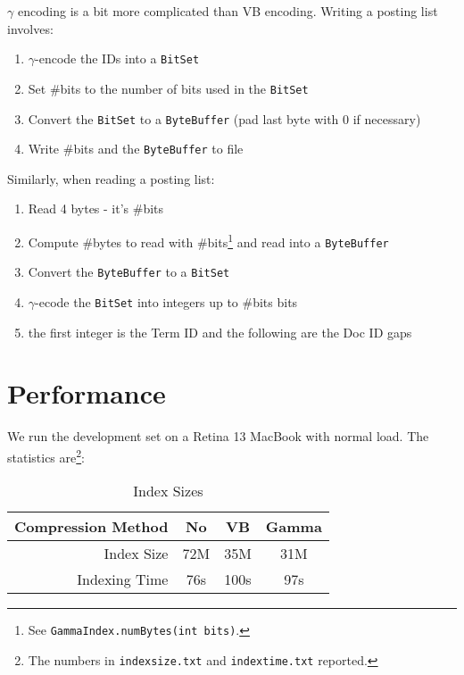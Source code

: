 \documentclass{article}
\begin{document}
$\gamma$ encoding is a bit more complicated than VB encoding. Writing a
posting list involves:
\begin{enumerate}
  \item $\gamma$-encode the IDs into a {\texttt{BitSet}}
  
  \item Set \#bits to the number of bits used in the {\texttt{BitSet}}
  
  \item Convert the {\texttt{BitSet}} to a {\texttt{ByteBuffer}} (pad last byte
  with 0 if necessary)
  
  \item Write \#bits and the {\texttt{ByteBuffer}} to file
\end{enumerate}
Similarly, when reading a posting list:
\begin{enumerate}
  \item Read 4 bytes - it's \#bits
  
  \item Compute \#bytes to read with \#bits{\footnote{See
  {\texttt{GammaIndex.numBytes(int bits)}}.}} and read into a
  {\texttt{ByteBuffer}}
  
  \item Convert the {\texttt{ByteBuffer}} to a {\texttt{BitSet}}
  
  \item $\gamma$-ecode the {\texttt{BitSet}} into integers up to \#bits bits
  
  \item the first integer is the Term ID and the following are the Doc ID gaps
\end{enumerate}

\section{Performance}

We run the development set on a Retina 13 MacBook with normal load. The
statistics are{\footnote{The numbers in {\texttt{indexsize.txt}} and
{\texttt{indextime.txt}} reported.}}:

\begin{table}[h]
  \begin{tabular}{|r|c|c|c|}
    \hline
    Compression Method & No & VB & Gamma\\
    \hline
    Index Size & 72M & 35M & 31M\\
    \hline
    Indexing Time & 76s & 100s & 97s\\
    \hline
  \end{tabular}
  \caption{Index Sizes}
\end{table}
\end{document}
